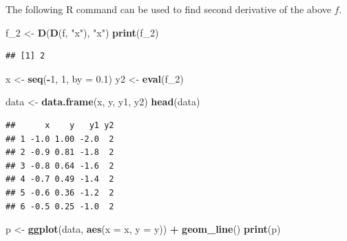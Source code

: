 \documentclass[]{book}
\newenvironment{Shaded}{\begin{snugshade}}{\end{snugshade}}
\newcommand{\DataTypeTok}[1]{\textcolor[rgb]{0.13,0.29,0.53}{#1}}
\newcommand{\DecValTok}[1]{\textcolor[rgb]{0.00,0.00,0.81}{#1}}
\newcommand{\FloatTok}[1]{\textcolor[rgb]{0.00,0.00,0.81}{#1}}
\newcommand{\KeywordTok}[1]{\textcolor[rgb]{0.13,0.29,0.53}{\textbf{#1}}}
\newcommand{\NormalTok}[1]{#1}
\newcommand{\OperatorTok}[1]{\textcolor[rgb]{0.81,0.36,0.00}{\textbf{#1}}}
\newcommand{\StringTok}[1]{\textcolor[rgb]{0.31,0.60,0.02}{#1}}
\begin{document}
The following R command can be used to find second derivative of the above \(f\).

\begin{Shaded}
\begin{Highlighting}[]
\NormalTok{f_}\DecValTok{2}\NormalTok{ <-}\StringTok{ }\KeywordTok{D}\NormalTok{(}\KeywordTok{D}\NormalTok{(f, }\StringTok{"x"}\NormalTok{), }\StringTok{"x"}\NormalTok{)}
\KeywordTok{print}\NormalTok{(f_}\DecValTok{2}\NormalTok{)}
\end{Highlighting}
\end{Shaded}

\begin{verbatim}
## [1] 2
\end{verbatim}

\begin{Shaded}
\begin{Highlighting}[]
\NormalTok{x <-}\StringTok{ }\KeywordTok{seq}\NormalTok{(}\OperatorTok{-}\DecValTok{1}\NormalTok{, }\DecValTok{1}\NormalTok{, }\DataTypeTok{by =} \FloatTok{0.1}\NormalTok{)}
\NormalTok{y2 <-}\StringTok{ }\KeywordTok{eval}\NormalTok{(f_}\DecValTok{2}\NormalTok{)}

\NormalTok{data <-}\StringTok{ }\KeywordTok{data.frame}\NormalTok{(x, y, y1, y2)}
\KeywordTok{head}\NormalTok{(data)}
\end{Highlighting}
\end{Shaded}

\begin{verbatim}
##      x    y   y1 y2
## 1 -1.0 1.00 -2.0  2
## 2 -0.9 0.81 -1.8  2
## 3 -0.8 0.64 -1.6  2
## 4 -0.7 0.49 -1.4  2
## 5 -0.6 0.36 -1.2  2
## 6 -0.5 0.25 -1.0  2
\end{verbatim}

\begin{Shaded}
\begin{Highlighting}[]
\NormalTok{p <-}\StringTok{ }\KeywordTok{ggplot}\NormalTok{(data, }\KeywordTok{aes}\NormalTok{(}\DataTypeTok{x =}\NormalTok{ x, }\DataTypeTok{y =}\NormalTok{ y)) }\OperatorTok{+}
\StringTok{  }\KeywordTok{geom_line}\NormalTok{()}
\KeywordTok{print}\NormalTok{(p)}
\end{Highlighting}
\end{Shaded}
\end{document}
